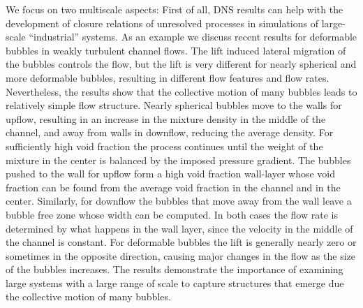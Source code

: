 \documentclass[article, A4, 11pt]{llncs}%
\begin{document}
We focus on two multiscale aspects: First of all, DNS results can help with the development of closure relations of unresolved processes in simulations of large-scale ``industrial'' systems. As an example we discuss recent results for deformable bubbles in weakly turbulent channel flows. The lift induced lateral migration of the bubbles controls the flow, but the lift is very different for nearly spherical and more deformable bubbles, resulting in different flow features and flow rates. Nevertheless, the results show that the collective motion of many bubbles leads to relatively simple flow structure. Nearly spherical bubbles move to the walls for upflow, resulting in an increase in the mixture density in the middle of the channel, and away from walls in downflow, reducing the average density. For sufficiently high void fraction the process continues until the weight of the mixture in the center is balanced by the imposed pressure gradient. The bubbles pushed to the wall for upflow form a high void fraction wall-layer whose void fraction can be found from the average void fraction in the channel and in the center. Similarly, for downflow the bubbles that move away from the wall leave a bubble free zone whose width can be computed. In both cases the flow rate is determined by what happens in the wall layer, since the velocity in the middle of the channel is constant. For deformable bubbles the lift is generally nearly zero or sometimes in the opposite direction, causing major changes in the flow as the size of the bubbles increases. The results demonstrate the importance of examining large systems with a large range of scale to capture structures that emerge due the collective motion of many bubbles.

\end{document}
